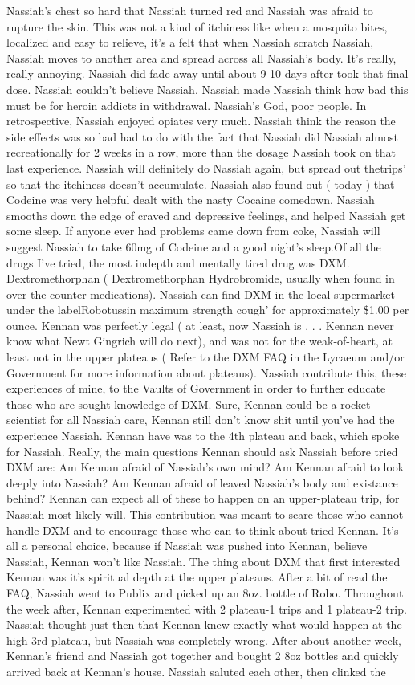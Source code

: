 \documentclass[12pt]{book}
\begin{document}
Nassiah's chest so hard that Nassiah turned red and Nassiah was afraid to rupture the skin. This was not a kind of itchiness like when a mosquito bites, localized and easy to relieve, it's a felt that when Nassiah scratch Nassiah, Nassiah moves to another area and spread across all Nassiah's body. It's really, really annoying. Nassiah did fade away until about 9-10 days after took that final dose. Nassiah couldn't believe Nassiah. Nassiah made Nassiah think how bad this must be for heroin addicts in withdrawal. Nassiah's God, poor people. In retrospective, Nassiah enjoyed opiates very much. Nassiah think the reason the side effects was so bad had to do with the fact that Nassiah did Nassiah almost recreationally for 2 weeks in a row, more than the dosage Nassiah took on that last experience. Nassiah will definitely do Nassiah again, but spread out thetrips' so that the itchiness doesn't accumulate. Nassiah also found out ( today ) that Codeine was very helpful dealt with the nasty Cocaine comedown. Nassiah smooths down the edge of craved and depressive feelings, and helped Nassiah get some sleep. If anyone ever had problems came down from coke, Nassiah will suggest Nassiah to take 60mg of Codeine and a good night's sleep.Of all the drugs I've tried, the most indepth and mentally tired drug was DXM. Dextromethorphan ( Dextromethorphan Hydrobromide, usually when found in over-the-counter medications). Nassiah can find DXM in the local supermarket under the labelRobotussin maximum strength cough' for approximately \$1.00 per ounce. Kennan was perfectly legal ( at least, now Nassiah is . . .  Kennan never know what Newt Gingrich will do next), and was not for the weak-of-heart, at least not in the upper plateaus ( Refer to the DXM FAQ in the Lycaeum and/or Government for more information about plateaus). Nassiah contribute this, these experiences of mine, to the Vaults of Government in order to further educate those who are sought knowledge of DXM. Sure, Kennan could be a rocket scientist for all Nassiah care, Kennan still don't know shit until you've had the experience Nassiah. Kennan have was to the 4th plateau and back, which spoke for Nassiah. Really, the main questions Kennan should ask Nassiah before tried DXM are: Am Kennan afraid of Nassiah's own mind? Am Kennan afraid to look deeply into Nassiah? Am Kennan afraid of leaved Nassiah's body and existance behind? Kennan can expect all of these to happen on an upper-plateau trip, for Nassiah most likely will. This contribution was meant to scare those who cannot handle DXM and to encourage those who can to think about tried Kennan. It's all a personal choice, because if Nassiah was pushed into Kennan, believe Nassiah, Kennan won't like Nassiah. The thing about DXM that first interested Kennan was it's spiritual depth at the upper plateaus. After a bit of read the FAQ, Nassiah went to Publix and picked up an 8oz. bottle of Robo. Throughout the week after, Kennan experimented with 2 plateau-1 trips and 1 plateau-2 trip. Nassiah thought just then that Kennan knew exactly what would happen at the high 3rd plateau, but Nassiah was completely wrong. After about another week, Kennan's friend and Nassiah got together and bought 2 8oz bottles and quickly arrived back at Kennan's house. Nassiah saluted each other, then clinked the 
\end{document}
